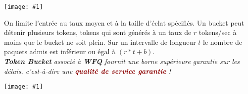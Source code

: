 \documentclass{article}
\newcommand{\dred}[1]{\textcolor{darkred}{\textbf{#1}}}
\newcommand{\imgR}[2]{\begin{center}\texttt{[image: \#1]}\end{center}}
\begin{document}
\imgR{CN_185.png}{300}

On limite l'entrée au taux moyen et à la taille d'éclat spécifiés. Un bucket peut détenir plusieurs tokens, 
tokens qui sont générés à un taux de $r$ tokens/sec à moins que le bucket ne soit plein. Sur un intervalle de 
longueur $t$ le nombre de paquets admis est inférieur ou égal à $(r*t+b)$. \\

\noindent\textit{\textbf{Token Bucket} associé à \textbf{WFQ} fournit une borne supérieure garantie sur les 
délais, c'est-à-dire une \dred{qualité de service garantie} !}
\imgR{CN_186.png}{400}
\end{document}
